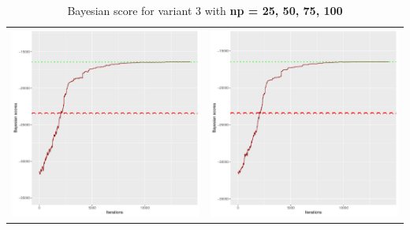 \documentclass[]{scrartcl}
\begin{document}
\begin{table}[h!]
\begin{tabular}{cc}
\includegraphics[scale = 0.4]{./figs/win95pts/v3/75/bayBoundsEvolution-14252.pdf} & 
\includegraphics[scale = 0.4]{./figs/win95pts/v3/100/bayBoundsEvolution-14252.pdf} \\
\end{tabular}
\caption{Bayesian score for variant 3 with \textbf{np =  25, 50, 75, 100}}
\end{table}
\end{document}
